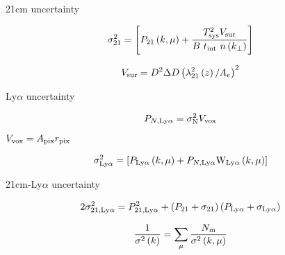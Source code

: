 21cm uncertainty

\begin{equation}
\sigma_{21}^2 = \left[ P_{21}\left(k, \mu \right) + \frac{T^2_{\rm sys} V_{\rm sur}}{B \ t_{\rm int} \ n \left(k_{\perp}\right)} \right]
\end{equation}

\begin{equation}
V_{\rm sur} = D^2 \Delta D \left( \lambda_{21}^2 \left( z \right) / A_e\right)^2
\end{equation}


Ly$\alpha$ uncertainty

\begin{equation}
P_{N, \rm Ly\alpha} = \sigma_{\rm N}^2 V_{\rm vox}
\end{equation}

$V_{\rm vox} = A_{\rm pix} r_{\rm pix}$

\begin{equation}
\sigma_{\rm Ly\alpha}^2 = \left[ P_{\rm Ly\alpha}\left(k, \mu \right) + P_{N, \rm Ly\alpha} {\rm W}_{\rm Ly\alpha}\left(k, \mu \right) \right]
\end{equation}

21cm-Ly$\alpha$ uncertainty


\begin{equation}
    2 \sigma^2_{21, \rm Ly\alpha} = P^2_{21, \rm Ly\alpha} +
      \left(P_{21} + \sigma_{21} \right) \left( P_{\rm Ly\alpha} + \sigma_{\rm Ly\alpha}\right)
\end{equation}

\begin{equation}
\frac{1}{\sigma^2 \left( k \right)} = \sum_{\mu} \frac{N_{\rm m}}{\sigma^2 \left( k, \mu \right)}
\end{equation}

